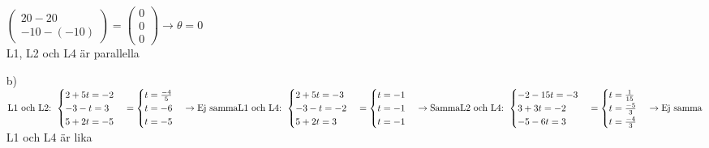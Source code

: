 \begin{enumerate}
\begin{math}
\begin{pmatrix}
                20-20\\
                -10-(-10)
            \end{pmatrix}
            =\begin{pmatrix}
                0\\
                0\\
                0
            \end{pmatrix}
            \rightarrow\theta=0
        \end{math}
        \\
        L1, L2 och L4 är parallella
    \item[b)]
        \begin{math}
            \text{L1 och L2: }
            \begin{cases}
                2+5t=-2\\
                -3-t=3\\
                5+2t=-5
            \end{cases}
            =\begin{cases}
                t=\frac{-4}{5}\\
                t=-6\\
                t=-5
            \end{cases}
            \rightarrow
            \text{Ej samma}
            \\
            \text{L1 och L4: }
            \begin{cases}
                2+5t=-3\\
                -3-t=-2\\
                5+2t=3
            \end{cases}
            =\begin{cases}
                t=-1\\
                t=-1\\
                t=-1
            \end{cases}
            \rightarrow
            \text{Samma}
            \\
            \text{L2 och L4: }
            \begin{cases}
                -2-15t=-3\\
                3+3t=-2\\
                -5-6t=3
            \end{cases}
            =\begin{cases}
                t=\frac{1}{15}\\
                t=\frac{-5}{3}\\
                t=\frac{-4}{3}
            \end{cases}
            \rightarrow
            \text{Ej samma}
        \end{math}
        \\
        L1 och L4 är lika
\end{enumerate}